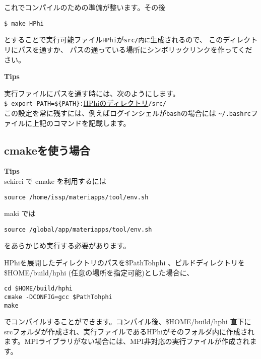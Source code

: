 これでコンパイルのための準備が整います。その後
\begin{verbatim}
$ make HPhi
\end{verbatim}
とすることで実行可能ファイル\verb|HPhi|が\verb|src/内に|生成されるので、
このディレクトリにパスを通すか、
パスの通っている場所にシンボリックリンクを作ってください。

\begin{screen}
\Large 
{\bf Tips}
\normalsize

実行ファイルにパスを通す時には、次のようにします。
\\
\verb|$ export PATH=${PATH}:|\underline{HPhiのディレクトリ}\verb|/src/|
\\
この設定を常に残すには、例えばログインシェルが\verb|bash|の場合には
\verb|~/.bashrc|ファイルに上記のコマンドを記載します。
\end{screen}

\subsection{cmakeを使う場合}

\begin{screen}
\Large 
{\bf Tips}
\normalsize\\
sekirei で cmake を利用するには
\begin{verbatim}
source /home/issp/materiapps/tool/env.sh
\end{verbatim}
maki では
\begin{verbatim}
source /global/app/materiapps/tool/env.sh
\end{verbatim}
をあらかじめ実行する必要があります。
\end{screen}

HPhiを展開したディレクトリのパスを\$PathTohphi 、ビルドディレクトリを\$HOME/build/hphi (任意の場所を指定可能)とした場合に、
\begin{verbatim}
cd $HOME/build/hphi
cmake -DCONFIG=gcc $PathTohphi
make
\end{verbatim}
でコンパイルすることができます。コンパイル後、\$HOME/build/hphi 直下にsrcフォルダが作成され、実行ファイルであるHPhiがそのフォルダ内に作成されます。MPIライブラリがない場合には、MPI非対応の実行ファイルが作成されます。

